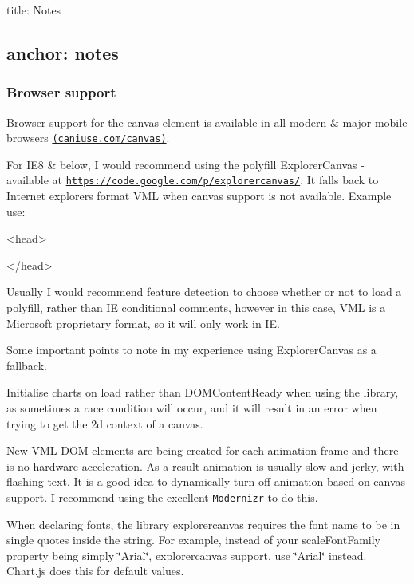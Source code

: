 

 title\+: Notes \subsection*{anchor\+: notes }

\subsubsection*{Browser support}

Browser support for the canvas element is available in all modern \& major mobile browsers \href{http://caniuse.com/canvas}{\tt (caniuse.\+com/canvas)}.

For I\+E8 \& below, I would recommend using the polyfill Explorer\+Canvas -\/ available at \href{https://code.google.com/p/explorercanvas/}{\tt https\+://code.\+google.\+com/p/explorercanvas/}. It falls back to Internet explorer\textquotesingle{}s format V\+ML when canvas support is not available. Example use\+:


\begin{DoxyCode}
<head>
    
</head>
\end{DoxyCode}


Usually I would recommend feature detection to choose whether or not to load a polyfill, rather than IE conditional comments, however in this case, V\+ML is a Microsoft proprietary format, so it will only work in IE.

Some important points to note in my experience using Explorer\+Canvas as a fallback.


\begin{DoxyItemize}
\item Initialise charts on load rather than D\+O\+M\+Content\+Ready when using the library, as sometimes a race condition will occur, and it will result in an error when trying to get the 2d context of a canvas.
\item New V\+ML D\+OM elements are being created for each animation frame and there is no hardware acceleration. As a result animation is usually slow and jerky, with flashing text. It is a good idea to dynamically turn off animation based on canvas support. I recommend using the excellent \href{http://modernizr.com/}{\tt Modernizr} to do this.
\item When declaring fonts, the library explorercanvas requires the font name to be in single quotes inside the string. For example, instead of your scale\+Font\+Family property being simply \char`\"{}\+Arial\char`\"{}, explorercanvas support, use \char`\"{}\textquotesingle{}\+Arial\textquotesingle{}\char`\"{} instead. Chart.\+js does this for default values.
\end{DoxyItemize}

